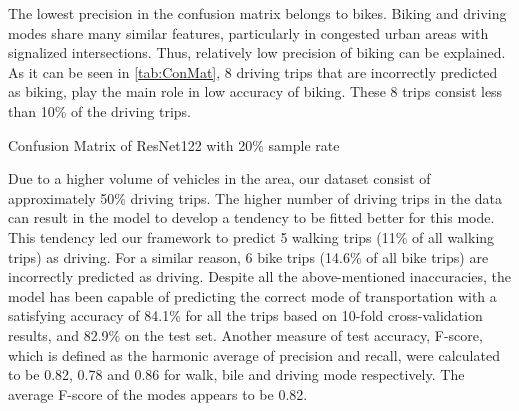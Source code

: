 The lowest precision in the confusion matrix belongs to bikes. Biking and driving modes share many similar features, particularly in congested urban areas with signalized intersections. Thus, relatively low precision of biking can be explained. As it can be seen in \cref{tab:ConMat}, 8 driving trips that are incorrectly predicted as biking, play the main role in low accuracy of biking. These 8 trips consist less than 10\% of the driving trips. 
\begin{table}
\centering
\caption{Confusion Matrix of ResNet122 with 20\% sample rate} 
\small
{}
\label{tab:ConMat}
\end{table}
Due to a higher volume of vehicles in the area, our dataset consist of approximately 50\% driving trips. The higher number of driving trips in the data can result in the model to develop a tendency to be fitted better for this mode. This tendency led our framework to predict 5 walking trips (11\% of all walking trips) as driving. For a similar reason, 6 bike trips (14.6\% of all bike trips) are incorrectly predicted as driving. Despite all the above-mentioned inaccuracies, the model has been capable of predicting the correct mode of transportation with a satisfying accuracy of 84.1\% for all the trips based on 10-fold cross-validation results, and 82.9\% on the test set. Another measure of test accuracy, F-score, which is defined as the harmonic average of precision and recall, were calculated to be 0.82, 0.78 and 0.86 for walk, bile and driving mode respectively. The average F-score of the modes appears to be 0.82.